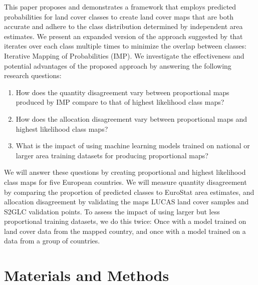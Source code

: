     This paper proposes and demonstrates a framework that employs predicted probabilities for land cover classes to create land cover maps that are both accurate and adhere to the class distribution determined by independent area estimates. We present an expanded version of the approach suggested by \citet{horvath2021comparison} that iterates over each class multiple times to minimize the overlap between classes: Iterative Mapping of Probabilities (IMP). We investigate the effectiveness and potential advantages of the proposed approach by answering the following research questions:
        
    \begin{enumerate}
    \item How does the quantity disagreement vary between proportional maps produced by IMP compare to that of highest likelihood class maps?
    \item How does the allocation disagreement vary between proportional maps and highest likelihood class maps?
    \item What is the impact of using machine learning models trained on national or larger area training datasets for producing proportional maps?
    \end{enumerate}

    We will answer these questions by creating proportional and highest likelihood class maps for five European countries. We will measure quantity disagreement by comparing the proportion of predicted classes to EuroStat area estimates, and allocation disagreement by validating the maps LUCAS land cover samples and S2GLC validation points. To assess the impact of using larger but less proportional training datasets, we do this twice: Once with a model trained on land cover data from the mapped country, and once with a model trained on a data from a group of countries.
        
\section{Materials and Methods}

